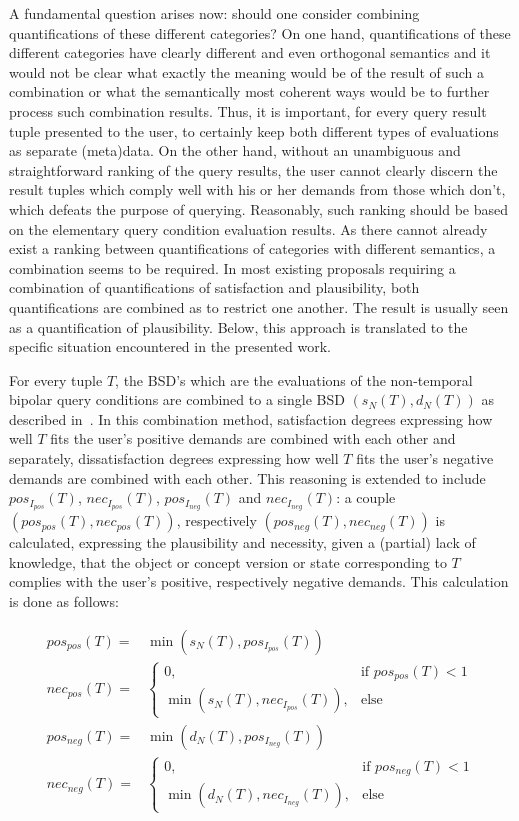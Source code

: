 \documentclass[runningheads,a4paper]{llncs}
\begin{document}
A fundamental question arises now: should one consider combining quantifications of these different categories? On one hand, quantifications of these different categories have clearly different and even orthogonal semantics and it would not be clear what exactly the meaning would be of the result of such a combination or what the semantically most coherent ways would be to further process such combination results. Thus, it is important, for every query result tuple presented to the user, to certainly keep both different types of evaluations as separate (meta)data. On the other hand, without an unambiguous and straightforward ranking of the query results, the user cannot clearly discern the result tuples which comply well with his or her demands from those which don't, which defeats the purpose of querying. Reasonably, such ranking should be based on the elementary query condition evaluation results. As there cannot already exist a ranking between quantifications of categories with different semantics, a combination seems to be required. In most existing proposals requiring a combination of quantifications of satisfaction and plausibility, both quantifications are combined as to restrict one another. The result is usually seen as a quantification of plausibility. Below, this approach is translated to the specific situation encountered in the presented work.

For every tuple $T$, the BSD's which are the evaluations of the non-temporal bipolar query conditions are combined to a single BSD $(s_N(T), d_N(T))$ as described in~\cite{Matthe2011ijis}. In this combination method, satisfaction degrees expressing how well $T$ fits the user's positive demands are combined with each other and separately, dissatisfaction degrees expressing how well $T$ fits the user's negative demands are combined with each other. This reasoning is extended to include $pos_{I_{pos}}(T)$, $nec_{I_{pos}}(T)$, $pos_{I_{neg}}(T)$ and $nec_{I_{neg}}(T)$: a couple $(pos_{pos}(T), nec_{pos}(T))$, respectively $(pos_{neg}(T), nec_{neg}(T))$ is calculated, expressing the plausibility and necessity, given a (partial) lack of knowledge, that the object or concept version or state corresponding to $T$ complies with the user's positive, respectively negative demands. This calculation is done as follows:

\vspace{-10pt}
\begin{align}
pos_{pos}(T) = & \min(s_N(T), pos_{I_{pos}}(T)) \nonumber \\
nec_{pos}(T) = &
	\begin{cases}
	0, & \text{if } pos_{pos}(T) < 1 \\
	\min(s_N(T), nec_{I_{pos}}(T)), & \text{else}
	\end{cases}
	\nonumber \\
pos_{neg}(T) = & \min(d_N(T), pos_{I_{neg}}(T)) \nonumber \\
nec_{neg}(T) = &
	\begin{cases}
	0, & \text{if } pos_{neg}(T) < 1 \\
	\min(d_N(T), nec_{I_{neg}}(T)), & \text{else}
	\end{cases}
	\nonumber
\end{align}
\end{document}

